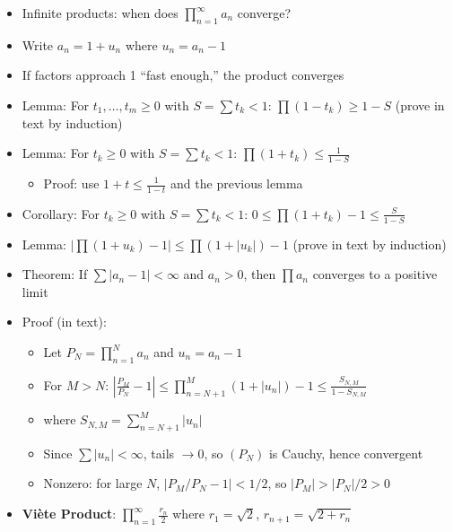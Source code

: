 \documentclass[
  10pt,
  letterpaper,
]{scrbook}
\providecommand{\tightlist}{%
  \setlength{\itemsep}{0pt}\setlength{\parskip}{0pt}}
\begin{document}
\begin{itemize}
\tightlist
\item
  Infinite products: when does \(\prod_{n=1}^{\infty} a_n\) converge?
\item
  Write \(a_n = 1 + u_n\) where \(u_n = a_n - 1\)
\item
  If factors approach 1 ``fast enough,'' the product converges
\item
  Lemma: For \(t_1, \ldots, t_m \geq 0\) with \(S = \sum t_k < 1\):
  \(\prod(1-t_k) \geq 1 - S\) (prove in text by induction)
\item
  Lemma: For \(t_k \geq 0\) with \(S = \sum t_k < 1\):
  \(\prod(1+t_k) \leq \frac{1}{1-S}\)

  \begin{itemize}
  \tightlist
  \item
    Proof: use \(1 + t \leq \frac{1}{1-t}\) and the previous lemma
  \end{itemize}
\item
  Corollary: For \(t_k \geq 0\) with \(S = \sum t_k < 1\):
  \(0 \leq \prod(1+t_k) - 1 \leq \frac{S}{1-S}\)
\item
  Lemma: \(|\prod(1+u_k) - 1| \leq \prod(1+|u_k|) - 1\) (prove in text
  by induction)
\item
  Theorem: If \(\sum |a_n - 1| < \infty\) and \(a_n > 0\), then
  \(\prod a_n\) converges to a positive limit
\item
  Proof (in text):

  \begin{itemize}
  \tightlist
  \item
    Let \(P_N = \prod_{n=1}^{N} a_n\) and \(u_n = a_n - 1\)
  \item
    For \(M > N\):
    \(\left|\frac{P_M}{P_N} - 1\right| \leq \prod_{n=N+1}^{M}(1+|u_n|) - 1 \leq \frac{S_{N,M}}{1-S_{N,M}}\)
  \item
    where \(S_{N,M} = \sum_{n=N+1}^{M} |u_n|\)
  \item
    Since \(\sum |u_n| < \infty\), tails \(\to 0\), so \((P_N)\) is
    Cauchy, hence convergent
  \item
    Nonzero: for large \(N\), \(|P_M/P_N - 1| < 1/2\), so
    \(|P_M| > |P_N|/2 > 0\)
  \end{itemize}
\item
  \textbf{Viète Product}: \(\prod_{n=1}^{\infty} \frac{r_n}{2}\) where
  \(r_1 = \sqrt{2}\), \(r_{n+1} = \sqrt{2 + r_n}\)


\end{itemize}
\end{document}
